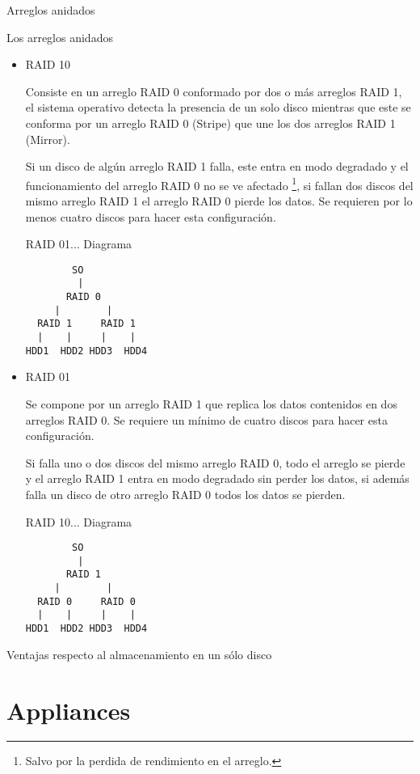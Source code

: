 Arreglos anidados

Los arreglos anidados \cite{3e1f0dad689a7971f226a3ded845ae63}

\begin{itemize}

  \item RAID 10

Consiste en un arreglo RAID 0 conformado por dos o m\'{a}s arreglos RAID 1, el sistema operativo detecta la presencia de un solo disco mientras que este se conforma por un arreglo RAID 0 (Stripe) que une los dos arreglos RAID 1 (Mirror).

Si un disco de alg\'{u}n arreglo RAID 1 falla, este entra en modo degradado y el funcionamiento del arreglo RAID 0 no se ve afectado \footnote{Salvo por la perdida de rendimiento en el arreglo.}, si fallan dos discos del mismo arreglo RAID 1 el arreglo RAID 0 pierde los datos. Se requieren por lo menos cuatro discos para hacer esta configuraci\'{o}n.

RAID 01... Diagrama \cite{3638d46cd02c0cd72e333c6d6f8f9608}
\begin{verbatim}
        SO
         |
       RAID 0
     |        |
  RAID 1     RAID 1
  |    |     |    |
HDD1  HDD2 HDD3  HDD4
\end{verbatim}
  

  \item RAID 01

Se compone por un arreglo RAID 1 que replica los datos contenidos en dos arreglos RAID 0. Se requiere un m\'{i}nimo de cuatro discos para hacer esta configuraci\'{o}n.

Si falla uno o dos discos del mismo arreglo RAID 0, todo el arreglo se pierde y el arreglo RAID 1 entra en modo degradado sin perder los datos, si adem\'{a}s falla un disco de otro arreglo RAID 0 todos los datos se pierden.
  
RAID 10... Diagrama \cite{9b286bf9442c2cf4d1e02ddf7322c92b}
\begin{verbatim}
        SO
         |
       RAID 1
     |        |
  RAID 0     RAID 0
  |    |     |    |
HDD1  HDD2 HDD3  HDD4
\end{verbatim}
  
\end{itemize}

Ventajas respecto al almacenamiento en un s\'{o}lo disco

    \section {Appliances}

